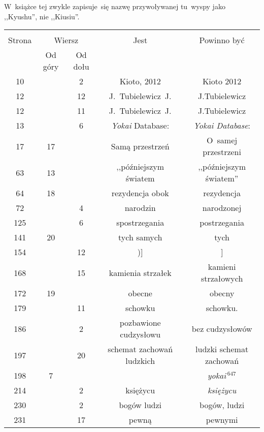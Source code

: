 \documentclass[a4paper,11pt]{article}
\begin{document}
\vspace{\spaceFour}


\start {} W~książce tej zwykle zapisuje~się nazwę przywoływanej
tu~wyspy jako ,,Kyushu'', %
nie ,,Kiusiu''.


\begin{center}
  \begin{tabular}{|c|c|c|c|c|}
    \hline
    & \multicolumn{2}{c|}{} & & \\
    Strona & \multicolumn{2}{c|}{Wiersz} & Jest
                              & Powinno być \\ \cline{2-3}
    & Od góry & Od dołu & & \\
    \hline
    10  & &  2 & Kioto, 2012 & Kioto 2012 \\
    12  & & 12 & J.~Tubielewicz~J. & J.Tubielewicz \\
    12  & & 11 & J.~Tubielewicz~J. & J.Tubielewicz \\
    13  & &  6 & \emph{Yokai} Database: & \emph{Yokai Database}: \\
    17  & 17 & & Samą przestrzeń & O~samej przestrzeni \\
    63  & 13 & & ,,późniejszym światem & ,,późniejszym światem'' \\
    64  & 18 & & rezydencja obok & rezydencja \\
    72  & &  4 & narodzin & narodzonej \\
    125 & &  6 & spostrzegania & postrzegania \\
    141 & 20 & & tych samych & tych \\
    154 & & 12 & )] & ] \\
    168 & & 15 & kamienia strzałek & kamieni strzałowych \\
    172 & 19 & & obecne & obecny \\
    179 & & 11 & schowku & schowku. \\
    186 & &  2 & pozbawione cudzysłowu & bez cudzysłowów \\
    197 & & 20 & schemat zachowań ludzkich & ludzki schemat zachowań \\
    198 &  7 & & & \emph{yokai$\,^{647}$} \\  %
    214 & &  2 & księżycu & \emph{księżycu} \\
    230 & &  2 & bogów ludzi & bogów, ludzi \\
    231 & & 17 & pewną & pewnymi \\
    \hline
  \end{tabular}
\end{center}
\end{document}
